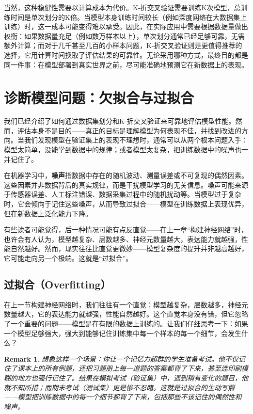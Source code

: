 \documentclass[lang=cn,zihao=-4,a4paper,fontset=windows]{beautybook}
\newtheorem*{remark}{\textbf{Remark}}
\begin{document}
当然，这种稳健性需要以计算成本为代价。K-折交叉验证需要训练K次模型，总训练时间是单次划分的K倍。当模型本身训练时间较长（例如深度网络在大数据集上训练）时，这一成本可能变得难以承受。因此，在实际应用中需要根据数据量做出权衡：如果数据量充足（例如数万样本以上），单次划分通常已经足够可靠，无需额外计算；而对于几千甚至几百的小样本问题，K-折交叉验证则是更值得推荐的选择，它用计算时间换取了评估结果的可靠性。无论采用哪种方式，最终目的都是同一件事：在模型部署到真实世界之前，尽可能准确地预测它在新数据上的表现。


\section{诊断模型问题：欠拟合与过拟合}

我们已经介绍了如何通过数据集划分和K-折交叉验证来可靠地评估模型性能。然而，评估本身不是目的——真正的目标是理解模型为何表现不佳，并找到改进的方向。当我们发现模型在验证集上的表现不理想时，通常可以从两个根本问题入手：模型太简单，没能学到数据中的规律；或者模型太复杂，把训练数据中的噪声也一并记住了。

\begin{definition}[][噪声（Noise）]
在机器学习中，\textbf{噪声}指数据中存在的随机波动、测量误差或不可复现的偶然因素。这些因素并非数据背后的真实规律，而是干扰模型学习的无关信息。噪声可能来源于传感器误差、人工标注错误、数据采集过程中的随机扰动等。当模型过于复杂时，它会倾向于记住这些噪声，从而导致过拟合——模型在训练数据上表现优异，但在新数据上泛化能力下降。
\end{definition}

有些读者可能觉得，后一种情况可能有点反直觉——在上一章“构建神经网络”时，也许会有人认为，模型越复杂、层数越多、神经元数量越大，表达能力就越强，性能自然越好。然而，现实往往比直觉更微妙——模型复杂度的提升并非越高越好，它可能走向另一个极端。这就是“过拟合”。

\subsection{过拟合（Overfitting）}

在上一节构建神经网络时，我们往往有一个直觉：模型越复杂，层数越多，神经元数量越大，它的表达能力就越强，性能自然越好。这个直觉本身没有错，但它忽略了一个重要的问题——模型是在有限的数据上训练的。让我们仔细思考一下：如果一个模型足够强大，强大到能够记住训练集中每一个样本的每一个细节，会发生什么？

\begin{remark}
想象这样一个场景：你让一个记忆力超群的学生准备考试。他不仅记住了课本上的所有例题，还把习题册上每一道题的答案都背了下来，甚至连印刷模糊的地方也强行记住了。结果在模拟考试（验证集）中，遇到稍有变化的题目，他就不知所措；而期末考试（测试集）更是惨不忍睹。这就是过拟合的生动写照——模型把训练数据中的每一个细节都背了下来，包括那些不该记住的偶然性和噪声。
\end{remark}
\end{document}
